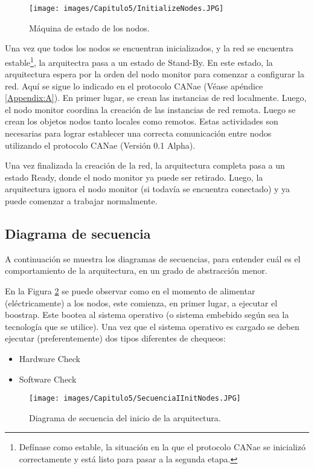 \begin{figure}[h!]
 \centering
 \texttt{[image: images/Capitulo5/InitializeNodes.JPG]}
  \caption{Máquina de estado de los nodos.}
\label{fig:StateMacineInitNodes}
\end{figure}

Una vez que todos los nodos se encuentran inicializados, y la red se encuentra
estable\footnote{Defínase como estable, la situación en la que el
  protocolo CANae se inicializó correctamente y está listo para pasar
  a la segunda etapa.}, la arquitectra pasa a un estado de Stand-By.
En este estado, la arquitectura espera por la orden del nodo monitor
para comenzar a configurar la red. Aquí se sigue lo indicado en el
protocolo CANae (Véase apéndice \ref{Appendix:A}). En primer lugar,
se crean las instancias de red localmente. Luego,  el nodo monitor
coordina la creación de las instancias de red remota. Luego se crean
los objetos nodos tanto locales como remotos. Estas actividades
son necesarias para lograr establecer una correcta comunicación
entre nodos utilizando el protocolo CANae (Versión 0.1 Alpha).

Una vez finalizada la creación de la red, la arquitectura completa
pasa a un estado Ready, donde el nodo monitor ya puede ser retirado.
Luego, la arquitectura ignora el nodo monitor (si todavía se encuentra
conectado) y ya puede comenzar a trabajar normalmente.

\subsection{Diagrama de secuencia}
A continuación se muestra los diagramas de secuencias, para entender
cuál es el comportamiento de la arquitectura, en un grado
de abstracción menor.

En la Figura \ref{fig:SecInitArq} se puede observar como en
el momento de alimentar (eléctricamente) a los nodos, este comienza,
en primer lugar, a ejecutar el boostrap. Este bootea al
sistema operativo (o sistema embebido según sea la tecnología
que se utilice). Una vez que el sistema operativo es cargado se
deben ejecutar (preferentemente) dos tipos diferentes de chequeos:
\begin{itemize}
\item Hardware Check
\item Software Check
\end{itemize}

\begin{figure}[h!]
 \centering
 \texttt{[image: images/Capitulo5/SecuenciaIInitNodes.JPG]}
  \caption{Diagrama de secuencia del inicio de la arquitectura.}
\label{fig:SecInitArq}
\end{figure}

